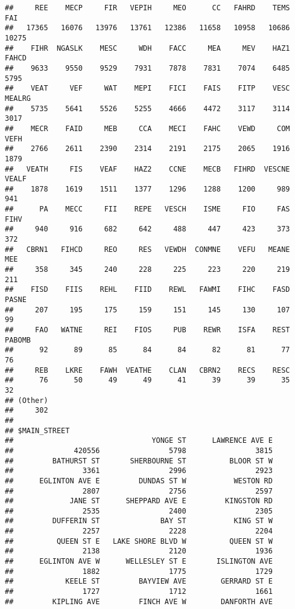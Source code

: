 \documentclass[]{article}
\begin{document}
\begin{verbatim}
##     REE    MECP     FIR   VEPIH     MEO      CC   FAHRD    TEMS     FAI 
##   17365   16076   13976   13761   12386   11658   10958   10686   10275 
##    FIHR  NGASLK    MESC     WDH    FACC     MEA     MEV    HAZ1   FAHCD 
##    9633    9550    9529    7931    7878    7831    7074    6485    5795 
##    VEAT     VEF     WAT    MEPI    FICI    FAIS    FITP    VESC  MEALRG 
##    5735    5641    5526    5255    4666    4472    3117    3114    3017 
##    MECR    FAID     MEB     CCA    MECI    FAHC    VEWD     COM    VEFH 
##    2766    2611    2390    2314    2191    2175    2065    1916    1879 
##   VEATH     FIS    VEAF    HAZ2    CCNE    MECB   FIHRD  VESCNE   VEALF 
##    1878    1619    1511    1377    1296    1288    1200     989     941 
##      PA    MECC     FII    REPE   VESCH    ISME     FIO     FAS    FIHV 
##     940     916     682     642     488     447     423     373     372 
##   CBRN1   FIHCD     REO     RES   VEWDH  CONMNE    VEFU   MEANE     MEE 
##     358     345     240     228     225     223     220     219     211 
##    FISD    FIIS    REHL    FIID    REWL   FAWMI    FIHC    FASD   PASNE 
##     207     195     175     159     151     145     130     107      99 
##     FAO   WATNE     REI    FIOS     PUB    REWR    ISFA    REST  PABOMB 
##      92      89      85      84      84      82      81      77      76 
##     REB    LKRE    FAWH  VEATHE    CLAN   CBRN2    RECS    RESC         
##      76      50      49      49      41      39      39      35      32 
## (Other) 
##     302 
## 
## $MAIN_STREET
##                                YONGE ST      LAWRENCE AVE E 
##              420556                5798                3815 
##         BATHURST ST       SHERBOURNE ST          BLOOR ST W 
##                3361                2996                2923 
##      EGLINTON AVE E         DUNDAS ST W           WESTON RD 
##                2807                2756                2597 
##             JANE ST      SHEPPARD AVE E         KINGSTON RD 
##                2535                2400                2305 
##         DUFFERIN ST              BAY ST           KING ST W 
##                2257                2228                2204 
##          QUEEN ST E   LAKE SHORE BLVD W          QUEEN ST W 
##                2138                2120                1936 
##      EGLINTON AVE W      WELLESLEY ST E       ISLINGTON AVE 
##                1882                1775                1729 
##            KEELE ST         BAYVIEW AVE        GERRARD ST E 
##                1727                1712                1661 
##         KIPLING AVE         FINCH AVE W        DANFORTH AVE 

\end{verbatim}
\end{document}
